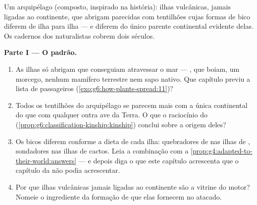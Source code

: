 \begin{problem}\label{pb:g9:how-species-change:1}
Um arquipélago (composto, inspirado na história): ilhas
vulcânicas, jamais ligadas ao continente, que abrigam 
parecidas com tentilhões cujas formas de bico diferem de ilha
para ilha --- e diferem do único parente continental evidente
delas. Os cadernos dos naturalistas cobrem dois séculos.

\medskip\noindent\textbf{Parte I --- O padrão.}
\begin{enumerate}
  \item As ilhas só abrigam  que conseguiam
        atravessar o mar --- ,  que boiam, um
        morcego, nenhum mamífero terrestre nem sapo nativo.
        Que capítulo previu a lista de passageiros
        (\cref{exo:g6:how-plants-spread:11})?
  \item Todos os tentilhões do arquipélago se parecem mais
        com a única  continental do que com qualquer
        outra ave da Terra. O que o raciocínio do 
        (\cref{prop:g6:classification-kinship:kinship})
        conclui sobre a origem deles?
  \item Os bicos diferem conforme a dieta de cada ilha:
        quebradores de  nas ilhas de ,
        sondadores nas ilhas de cactos. Leia a combinação com
        a \cref{prop:g4:adapted-to-their-world:answers} --- e
        depois diga o que este capítulo acrescenta que o
        capítulo da  não podia acrescentar.
  \item Por que ilhas vulcânicas jamais ligadas ao continente
        são a vitrine do motor? Nomeie o ingrediente da
        formação de  que elas fornecem no atacado.
\end{enumerate}


\end{problem}
